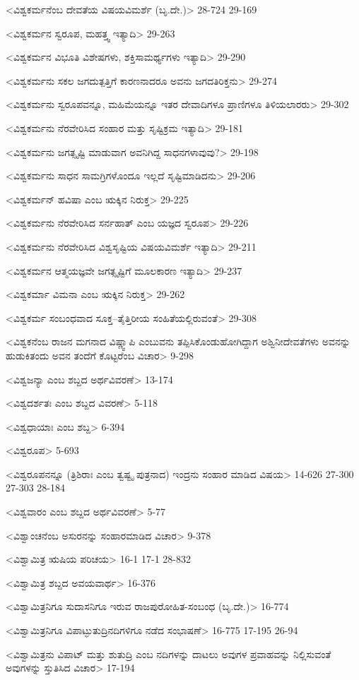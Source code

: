 <ವಿಶ್ವಕರ್ಮನೆಂಬ ದೇವತೆಯ ವಿಷಯವಿಮರ್ಶೆ (ಬೃ.ದೇ.)>
28-724 
29-169

<ವಿಶ್ವಕರ್ಮನ ಸ್ವರೂಪ, ಮಹತ್ತ್ವ ಇತ್ಯಾದಿ>
29-263

<ವಿಶ್ವಕರ್ಮನ ವಿಭೂತಿ ವಿಶೇಷಗಳು, ಶಕ್ತಿಸಾಮರ್ಥ್ಯಗಳು ಇತ್ಯಾದಿ>
29-290


<ವಿಶ್ವಕರ್ಮನು ಸಕಲ ಜಗದುತ್ಪತ್ತಿಗೆ ಕಾರಣನಾದರೂ ಅವನು ಜಗದತಿರಿಕ್ತನು>
29-274

<ವಿಶ್ವಕರ್ಮನು ಸ್ವರೂಪವನ್ನೂ, ಮಹಿಮೆಯನ್ನೂ ಇತರ ದೇವಾದಿಗಳೂ ಪ್ರಾಣಿಗಳೂ ತಿಳಿಯಲಾರರು>
29-302

<ವಿಶ್ವಕರ್ಮನು ನೆರವೇರಿಸಿದ ಸಂಹಾರ ಮತ್ತು ಸೃಷ್ಟಿಕ್ರಮ ಇತ್ಯಾದಿ>
29-181

<ವಿಶ್ವಕರ್ಮನು ಜಗತ್ಸೃಷ್ಟಿ ಮಾಡುವಾಗ ಅವನಿಗಿದ್ದ ಸಾಧನಗಳಾವುವು?>
29-198

<ವಿಶ್ವಕರ್ಮನು ಸಾಧನ ಸಾಮಗ್ರಿಗಳೊಂದೂ ಇಲ್ಲದೆ ಸೃಷ್ಟಿಮಾಡಿದನು>
29-206

<ವಿಶ್ವಕರ್ಮನ್‍ ಹವಿಷಾ ಎಂಬ ಋಕ್ಕಿನ ನಿರುಕ್ತ>
29-225

<ವಿಶ್ವಕರ್ಮನು ನೆರವೇರಿಸಿದ ಸರ್ನಹಾತ್‍ ಎಂಬ ಯಜ್ಞದ ಸ್ವರೂಪ>
29-226

<ವಿಶ್ವಕರ್ಮನು ನೆರವೇರಿಸಿದ ವಿಶ್ವಸೃಷ್ಟಿಯ ವಿಷಯವಿಮರ್ಶೆ ಇತ್ಯಾದಿ>
29-211

<ವಿಶ್ವಕರ್ಮನ ಆತ್ಮಯಜ್ಞವೇ ಜಗತ್ಸೃಷ್ಟಿಗೆ ಮೂಲಕಾರಣ ಇತ್ಯಾದಿ>
29-237

<ವಿಶ್ವಕರ್ಮಾ ವಿಮನಾ ಎಂಬ ಋಕ್ಕಿನ ನಿರುಕ್ತ>
29-262

<ವಿಶ್ವಕರ್ಮ ಸಂಬಂಧವಾದ ಸೂಕ್ತ–ತೈತ್ತಿರೀಯ ಸಂಹಿತೆಯಲ್ಲಿರುವಂತೆ>
29-308

<ವಿಶ್ವಕನೆಂಬ ರಾಜನ ಮಗನಾದ ವಿಷ್ಣ್ವಾಪಿ ಎಂಬುವನು ತಪ್ಪಿಸಿಕೊಂಡುಹೋಗಿದ್ದಾಗ ಅಶ್ವಿನೀದೇವತೆಗಳು ಅವನನ್ನು ಹುಡುಕಿತಂದು ಅವನ ತಂದೆಗೆ ಕೊಟ್ಟರೆಂಬ ವಿಚಾರ>
9-298

<ವಿಶ್ವಜನ್ಯಾ ಎಂಬ ಶಬ್ದದ ಅರ್ಥವಿವರಣೆ>
13-174

<ವಿಶ್ವದರ್ಶತಃ ಎಂಬ ಶಬ್ದದ ವಿವರಣೆ>
5-118

<ವಿಶ್ವಧಾಯಾಃ ಎಂಬ ಶಬ್ದ>
6-394

<ವಿಶ್ವರೂಪ>
5-693

<ವಿಶ್ವರೂಪನನ್ನೂ (ತ್ರಿಶಿರಾಃ ಎಂಬ ತ್ವಷ್ಟೃ ಪುತ್ರನಾದ) ಇಂದ್ರನು ಸಂಹಾರ ಮಾಡಿದ ವಿಷಯ>
14-626
27-300 
27-303
28-184

<ವಿಶ್ವವಾರಂ ಎಂಬ ಶಬ್ದದ ಅರ್ಥವಿವರಣೆ>
5-77

<ವಿಶ್ವಾಂಚನೆಂಬ ಅಸುರನನ್ನು ಸಂಹಾರಮಾಡಿದ ವಿಚಾರ>
9-378

<ವಿಶ್ವಾಮಿತ್ರ ಋಷಿಯ ಪರಿಚಯ>
16-1 
17-1
28-832

<ವಿಶ್ವಾಮಿತ್ರ ಶಬ್ದದ ಅವಯವಾರ್ಥ>
16-376

<ವಿಶ್ವಾಮಿತ್ರನಿಗೂ ಸುದಾಸನಿಗೂ ಇರುವ ರಾಜಪುರೋಹಿತ-ಸಂಬಂಧ (ಬೃ.ದೇ.)>
16-774

<ವಿಶ್ವಾಮಿತ್ರನಿಗೂ ವಿಪಾಟ್ಫುತುದ್ರಿನದಿಗಳಿಗೂ ನಡೆದ ಸಂಭಾಷಣೆ>
16-775 
17-195
26-94

<ವಿಶ್ವಾಮಿತ್ರನು ವಿಪಾಟ್‍ ಮತ್ತು ಶುತುದ್ರಿ ಎಂಬ ನದಿಗಳನ್ನು ದಾಟಲು ಅವುಗಳ ಪ್ರವಾಹವನ್ನು ನಿಲ್ಲಿಸುವಂತೆ ಅವುಗಳನ್ನು ಸ್ತುತಿಸಿದ ವಿಚಾರ>
17-194

